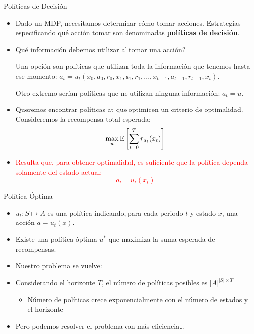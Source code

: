\documentclass[handout]{beamer}
\begin{document}
\begin{frame}{Políticas de Decisión}
\begin{itemize}
\item Dado un MDP, necesitamos determinar cómo tomar acciones. Estrategias especificando qué acción tomar son denominadas \textbf{políticas de decisión}.
\item<2-> Qué información debemos utilizar al tomar una acción?

Una opción son políticas que utilizan toda la información que tenemos hasta ese momento: $
a_t = u_t(x_0,a_0, r_0, x_1,a_1,r_1,...,x_{t-1},a_{t-1},r_{t-1},x_t)
$. 

Otro extremo serían políticas que no utilizan ninguna información: $a_t = u$.
\item<3-> Queremos encontrar políticas at que optimicen un criterio de optimalidad. Consideremos la recompensa total esperada: 
$$
\max_u {\rm E}\left[\sum_{t=0}^T r_{a_t}(x_t)\right]
$$
\item<4-> \textcolor{red}{Resulta que, para obtener optimalidad, es suficiente que la política dependa  solamente del estado actual: 
$$a_t = u_t(x_t)$$}
\end{itemize}
\end{frame}

\begin{frame}{Política Óptima}
\begin{itemize}
\item $u_t: S \mapsto A$ es una política indicando, para cada periodo $t$ y estado $x$, una acción $a = u_t(x)$.
\item<2-> Existe una política óptima $u^*$ que maximiza la suma esperada de recompensas.
\item<3-> Nuestro problema se vuelve:
\item<6-> Considerando el horizonte $T$, el número de políticas posibles es $|A|^{|S|\times T}$
\begin{itemize}
\item<7-> Número de políticas crece exponencialmente con el número de estados y el horizonte
\end{itemize}
\item<8-> Pero podemos resolver el problema con más eficiencia…
\end{itemize}    
\end{frame}
\end{document}
